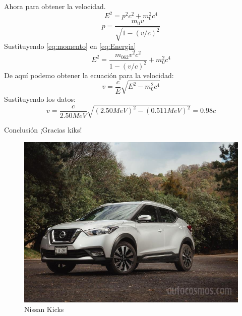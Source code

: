 \documentclass{beamer}
\begin{document}
    \begin{frame}{}
        Ahora para obtener la velocidad.
        \begin{equation}\label{eq:Energia}
            E^2 = p^2c^2 + m_0^2c^4
        \end{equation}
        \begin{equation}\label{eq:momento}
            p = \frac{m_0v}{\sqrt{1-(v/c)^2}}
        \end{equation}
        Sustituyendo \eqref{eq:momento} en \eqref{eq:Energia}
        \begin{equation*}
            E^2 = \frac{m_062v^2c^2}{1-(v/c)^2} + m_0^2c^4
        \end{equation*}
        De aqu\'i podemo obtener la ecuaci\'on para la velocidad:
        \begin{equation}
            v = \frac{c}{E}\sqrt{E^2 - m_0^2c^4}
        \end{equation}
        Sustituyendo los datos:
        \begin{equation*}
            v = \frac{c}{2.50MeV}\sqrt{(2.50MeV)^2 - (0.511MeV)^2} = 0.98c
        \end{equation*}
    \end{frame}
\begin{frame}{Conclusión}
¡Gracias kiks!
    \begin{figure}[h]
    \centering
    \includegraphics[scale = 0.35]{Kicks.jpg}
    \caption{Nissan Kicks}
    \label{fig:Kicks}
\end{figure}
\end{frame}
\end{document}
